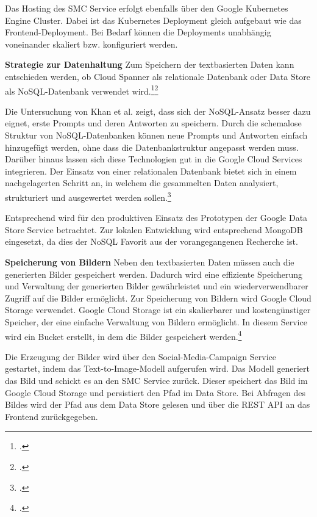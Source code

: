 Das Hosting des \ac{SMC} Service erfolgt ebenfalls über den Google Kubernetes Engine Cluster.
Dabei ist das Kubernetes Deployment gleich aufgebaut wie das Frontend-Deployment.
Bei Bedarf können die Deployments unabhängig voneinander skaliert bzw. konfiguriert werden.

\textbf{Strategie zur Datenhaltung}\newline
Zum Speichern der textbasierten Daten kann entschieden werden, ob Cloud Spanner als relationale Datenbank oder Data Store als \ac{NoSQL}-Datenbank verwendet wird.\footcite{google_spanner}\footcite{google_datastore}

Die Untersuchung von Khan et al. zeigt, dass sich der \ac{NoSQL}-Ansatz besser dazu eignet, erste Prompts und deren Antworten zu speichern.
Durch die schemalose Struktur von \ac{NoSQL}-Datenbanken können neue Prompts und Antworten einfach hinzugefügt werden, ohne dass die Datenbankstruktur angepasst werden muss.
Darüber hinaus lassen sich diese Technologien gut in die Google Cloud Services integrieren.
Der Einsatz von einer relationalen Datenbank bietet sich in einem nachgelagerten Schritt an, in welchem die gesammelten Daten analysiert, strukturiert und ausgewertet werden sollen.\footcite{Khan2022SQL}

Entsprechend wird für den produktiven Einsatz des Prototypen der Google Data Store Service betrachtet.
Zur lokalen Entwicklung wird entsprechend MongoDB eingesetzt, da dies der \ac{NoSQL} Favorit aus der vorangegangenen Recherche ist.

\textbf{Speicherung von Bildern}\newline
Neben den textbasierten Daten müssen auch die generierten Bilder gespeichert werden.
Dadurch wird eine effiziente Speicherung und Verwaltung der generierten Bilder gewährleistet und ein wiederverwendbarer Zugriff auf die Bilder ermöglicht.
Zur Speicherung von Bildern wird Google Cloud Storage verwendet.
Google Cloud Storage ist ein skalierbarer und kostengünstiger Speicher, der eine einfache Verwaltung von Bildern ermöglicht.
In diesem Service wird ein Bucket erstellt, in dem die Bilder gespeichert werden.\footcite{google_storage}

Die Erzeugung der Bilder wird über den Social-Media-Campaign Service gestartet, indem das Text-to-Image-Modell aufgerufen wird.
Das Modell generiert das Bild und schickt es an den \ac{SMC} Service zurück.
Dieser speichert das Bild im Google Cloud Storage und persistiert den Pfad im Data Store.
Bei Abfragen des Bildes wird der Pfad aus dem Data Store gelesen und über die \ac{REST} \ac{API} an das Frontend zurückgegeben.

